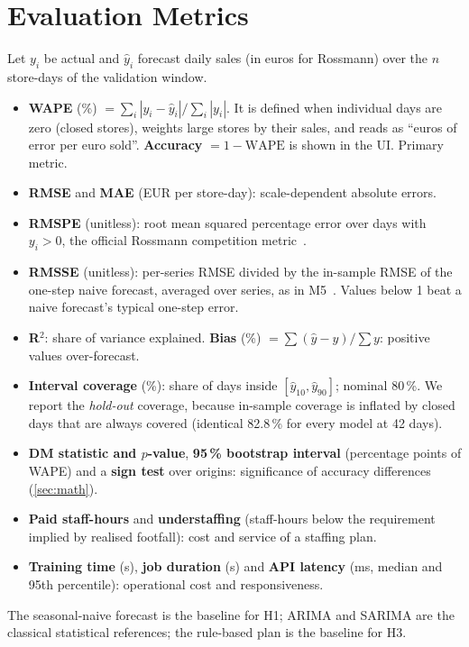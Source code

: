 \documentclass[conference]{IEEEtran}
\begin{document}
\section{Evaluation Metrics}\label{sec:metrics}
Let $y_i$ be actual and $\hat y_i$ forecast daily sales (in euros for Rossmann) over the $n$
store-days of the validation window.

\begin{itemize}
\item \textbf{WAPE} (\%) $=\sum_i |y_i-\hat y_i| / \sum_i |y_i|$. It is defined when individual days
  are zero (closed stores), weights large stores by their sales, and reads as ``euros of error per
  euro sold''. \textbf{Accuracy} $=1-\text{WAPE}$ is shown in the UI. Primary metric.
\item \textbf{RMSE} and \textbf{MAE} (EUR per store-day): scale-dependent absolute errors.
\item \textbf{RMSPE} (unitless): root mean squared percentage error over days with $y_i>0$, the
  official Rossmann competition metric~\cite{kaggle2015rossmann}.
\item \textbf{RMSSE} (unitless): per-series RMSE divided by the in-sample RMSE of the one-step
  naive forecast, averaged over series, as in M5~\cite{makridakis2022m5,hyndman2006another}. Values
  below 1 beat a naive forecast's typical one-step error.
\item \textbf{R$^2$}: share of variance explained. \textbf{Bias} (\%) $=\sum(\hat y-y)/\sum y$:
  positive values over-forecast.
\item \textbf{Interval coverage} (\%): share of days inside $[\hat y_{10}, \hat y_{90}]$; nominal 80\,\%.
  We report the \emph{hold-out} coverage, because in-sample coverage is inflated by closed days that
  are always covered (identical 82.8\,\% for every model at 42 days).
\item \textbf{DM statistic and $p$-value}, \textbf{95\,\% bootstrap interval} (percentage points of
  WAPE) and a \textbf{sign test} over origins: significance of accuracy differences (\cref{sec:math}).
\item \textbf{Paid staff-hours} and \textbf{understaffing} (staff-hours below the requirement implied
  by realised footfall): cost and service of a staffing plan.
\item \textbf{Training time} (s), \textbf{job duration} (s) and \textbf{API latency} (ms, median and
  95th percentile): operational cost and responsiveness.
\end{itemize}
The seasonal-naive forecast is the baseline for H1; ARIMA and SARIMA are the classical statistical
references; the rule-based plan is the baseline for H3.
\end{document}

